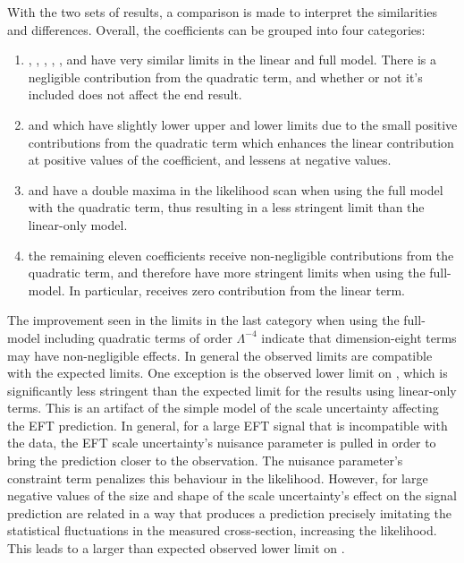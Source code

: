 With the two sets of results, a comparison is made to interpret the similarities and differences. Overall, the coefficients can be grouped into four categories:
\begin{enumerate}
    \item \chdd, \chwb, \che, \chlone, \chqthr{}, \chlthr{} and \cllone{} have very similar limits in the linear and full model. There is a negligible contribution from the quadratic term, and whether or not it's included does not affect the end result. 
    \item \chqone{} and \clqthr{} which have slightly lower upper and lower limits  due to the small positive contributions from the quadratic term which enhances the linear contribution at positive values of the coefficient, and lessens at negative values.
    \item \chg{} and \chu have a double maxima in the likelihood scan when using the full model with the quadratic term, thus resulting in a less stringent limit than the linear-only model.
    \item the remaining eleven coefficients receive non-negligible contributions from the quadratic term, and therefore have more stringent limits when using the full-model. In particular, \chgtil{} receives zero contribution from the linear term.
\end{enumerate}
The improvement seen in the limits in the last category when using the full-model including quadratic terms of order $\Lambda^{-4}$ indicate that dimension-eight terms may have non-negligible effects.
In general the observed limits are compatible with the expected
limits.
One  exception is  the observed lower limit on \clqone{}, which is significantly less stringent than
the expected limit for the results using linear-only terms.  This is an artifact of the simple model of the scale uncertainty affecting
the EFT prediction.
In general, for a large EFT signal that is incompatible with the data,
the EFT scale uncertainty's nuisance parameter is pulled in order to
bring the prediction closer to the observation. The nuisance parameter's constraint term 
penalizes this behaviour in the likelihood.
However, for large negative values of \clqone{} the size and shape of
the scale uncertainty's effect on the signal prediction
are related in a way that produces a prediction precisely imitating the
statistical fluctuations in the measured cross-section, increasing the likelihood.
This leads to a larger than expected observed lower limit on \clqone.

